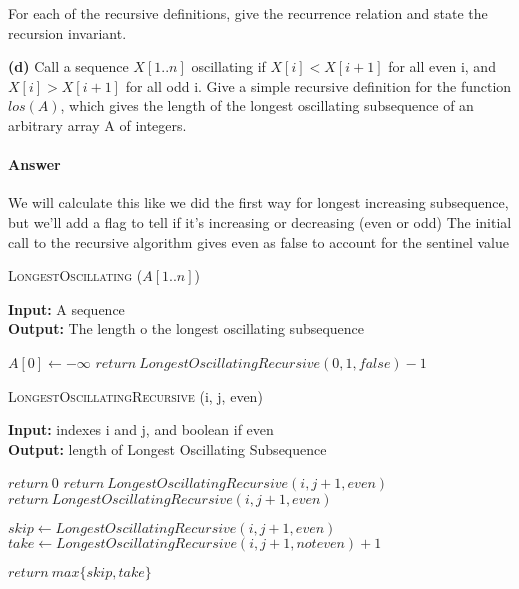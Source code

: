 \documentclass{article}
\begin{document}
For each of the recursive definitions, give the recurrence
relation and state the recursion invariant.

{\bf (d)} Call a sequence $X[1.. n]$ oscillating if $X[i] < X[i + 1]$ for all even i, and
$X[i] > X[i + 1]$ for all odd i. Give a simple recursive definition for
the function $los(A)$, which gives the length of the longest oscillating
subsequence of an arbitrary array A of integers.

\paragraph{Answer}

We will calculate this like we did the first way for longest increasing subsequence, but we'll add a
flag to tell if it's increasing or decreasing (even or odd)
The initial call to the recursive algorithm gives even as false to account for the sentinel value

\begin{algorithm} \caption{\textsc{LongestOscillating} ($A[1..n]$)}\label{alg:seb}
    {\bf Input:} A sequence\\
    {\bf Output:} The length o the longest oscillating subsequence
    \begin{algorithmic}[1]
        \State$A[0] \gets - \infty$
        \State$return\ LongestOscillatingRecursive(0, 1, false) -1$
    \end{algorithmic}
\end{algorithm}

\begin{algorithm} \caption{\textsc{LongestOscillatingRecursive} (i, j, even)}\label{alg:seb}
    {\bf Input:} indexes i and j, and boolean if even\\
    {\bf Output:} length of Longest Oscillating Subsequence
    \begin{algorithmic}[1]
            \State$return\ 0$
                \State$return\ LongestOscillatingRecursive(i, j+1, even)$
            \EndIf{}
        \Else{}
                \State$return\ LongestOscillatingRecursive(i, j+1, even)$
            \EndIf{}
        \EndIf{}

        \State$skip \gets LongestOscillatingRecursive(i, j+1, even)$
        \State$take \gets LongestOscillatingRecursive(i, j+1, not even) +1$

        \State$return\ max\{skip, take\}$
    \end{algorithmic}
\end{algorithm}
\end{document}
